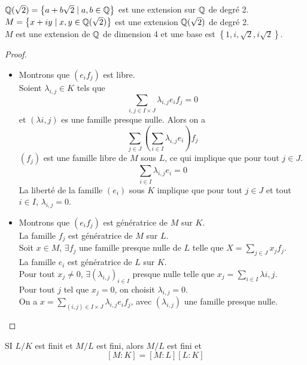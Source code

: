\begin{example}
	$\mathbb{Q}(\sqrt{2}) = \left\{ a + b\sqrt{2} \mid a,b \in \mathbb{Q} \right\}$ est une extension sur $\mathbb{Q}$ de degré 2.\\
	$M = \left\{ x + iy \mid x,y \in \mathbb{Q}(\sqrt{2}) \right\}$ est une extension $\mathbb{Q}(\sqrt{2})$ de degré 2.\\
	$M$ est une extension de $\mathbb{Q}$ de dimension 4 et une base est $\left\{ 1, i , \sqrt{2}, i\sqrt{2}\right\}$.
\end{example}


\begin{proof}
	\begin{itemize}
		\item Montrons que $(e_if_j)$ est libre. \\ %
		      Soient $\lambda_{i,j} \in K$ tels que
		      $$ \sum\limits_{i,j \in I \times J} \lambda_{i,j} e_i f_j = 0$$
		      et $(\lambda{i,j})$ es une famille presque nulle. Alors  on a
		      $$ \sum\limits_{j \in J} \left( \sum\limits_{i \in I} \lambda_{i,j} e_i \right) f_j $$
		      $(f_j)$ est une famille libre de $M$ sous $L$, ce qui implique que pour tout $j \in J$.
		      $$ \sum\limits_{i\in I } \lambda_{i,j} e_i = 0$$
		      La liberté de la famille $(e_i)$ sous $K$ implique que pour tout $j \in J$ et tout $i \in I$, $\lambda_{i,j} = 0$.
		\item Montrons que $(e_if_j)$  est génératrice de $M$ sur $K$.\\
		      La famille $f_j$ est génératrice de $M$ sur $L$.\\
		      Soit $x \in M$, $\exists f_j$ une famille presque nulle de $L$ telle que $X = \sum\limits_{j\in J} x_j f_j$.\\
		      La famille $e_i$ est génératrice de $L$ sur $K$.\\
		      Pour tout $x_j \neq 0 $, $\exists (\lambda_{i,j})_{i \in I}$ presque nulle telle que $x_j = \sum\limits_{i \in I} \lambda{i,j}$.\\
		      Pour tout $j$ tel que $x_j = 0$, on choisit $\lambda_{i,j} = 0$. \\
		      On a $x = \sum\limits_{(i,j)\in I\times J} \lambda_{i,j} e_i f_j$, avec $(\lambda_{i,j})$ une famille presque nulle.
	\end{itemize}
\end{proof}


\begin{coro}[important]
	SI $L / K$ est finit et $M/L$ est fini, alors $M/L$ est fini et
	$$ [M:K] = [M:L] [L:K] $$ %
\end{coro}



